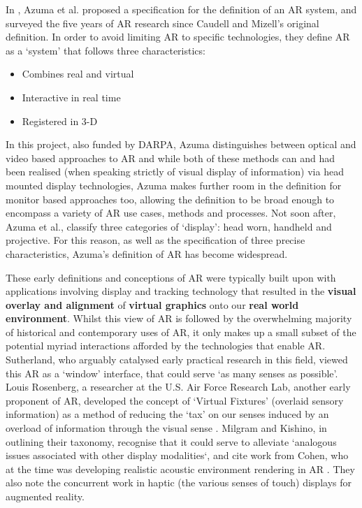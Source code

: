 In \citeyear{azuma1997}, Azuma et al. proposed a specification for the definition of an AR system, and surveyed the five years of AR research since Caudell and Mizell's original definition. In order to avoid limiting AR to specific technologies, they define AR as a `system' that follows three characteristics: 

\begin{itemize}
    \item Combines real and virtual
    \item Interactive in real time
    \item Registered in 3-D
\end{itemize}

In this project, also funded by DARPA, Azuma distinguishes between optical and video based approaches to AR and while both of these methods can and had been realised (when speaking strictly of visual display of information) via head mounted display technologies, Azuma makes further room in the definition for monitor based approaches too, allowing the definition to be broad enough to encompass a variety of AR use cases, methods and processes. Not soon after, Azuma et al., classify three categories of `display': head worn, handheld and projective. For this reason, as well as the specification of three precise characteristics, Azuma's definition of AR has become widespread. 

These early definitions and conceptions of AR were typically built upon with applications involving display and tracking technology that resulted in the \textbf{visual overlay and alignment} of \textbf{virtual graphics} onto our \textbf{real world environment}. Whilst this view of AR is followed by the overwhelming majority of historical and contemporary uses of AR, it only makes up a small subset of the potential myriad interactions afforded by the technologies that enable AR. Sutherland, who arguably catalysed early practical research in this field, viewed this AR as a `window' interface, that could serve `as many senses as possible'. Louis Rosenberg, a researcher at the U.S. Air Force Research Lab, another early proponent of AR, developed the concept of `Virtual Fixtures' (overlaid sensory information) as a method of reducing the `tax' on our senses induced by an overload of information through the visual sense \citep{rosenberg1993}. Milgram and Kishino, in outlining their taxonomy, recognise that it could serve to alleviate `analogous issues associated with other display modalities`, and cite work from Cohen, who at the time was developing realistic acoustic environment rendering in AR \citeyearpar{cohen1993}. They also note the concurrent work in haptic (the various senses of touch) displays for augmented reality. 

